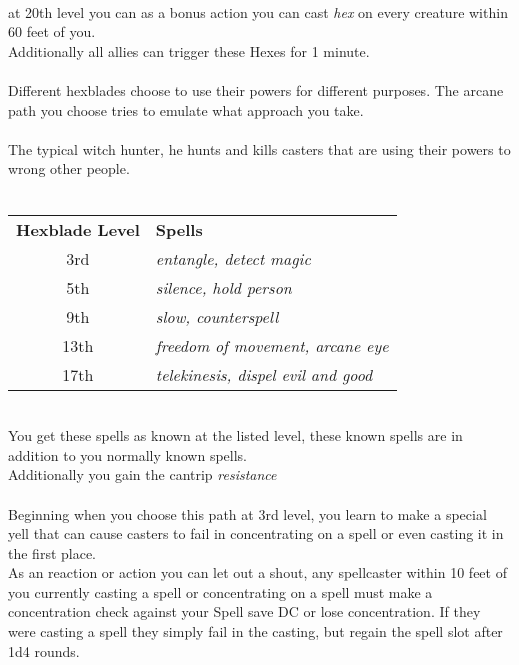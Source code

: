 \documentclass[a4paper]{article}
\begin{document}
\begin{multicols}{2}
\\
at 20th level you can as a bonus action you can cast \textit{hex} on every creature within 60 feet of you.\\
Additionally all allies can trigger these Hexes for 1 minute.\\
\\
Different hexblades choose to use their powers for different purposes. The arcane path you choose tries to emulate what approach you take.\\
\\
The typical witch hunter, he hunts and kills casters that are using their powers to wrong other people.\\
\\
\begin{tabular}{cp{5cm}}
{\bf Hexblade Level} & {\bf Spells}                         \\
\rowcolor[HTML]{B8EFAD} 
3rd                 & \textit{entangle, detect magic}\\
5th                 & \textit{silence, hold person}\\
\rowcolor[HTML]{B8EFAD} 
9th                 & \textit{slow, counterspell}\\
13th                & \textit{freedom of movement, arcane eye}\\
\rowcolor[HTML]{B8EFAD} 
17th                & \textit{telekinesis, dispel evil and good}\\
\end{tabular}
\\You get these spells as known at the listed level, these known spells are in addition to you normally known spells.\\
\indent Additionally you gain the cantrip \textit{resistance}\\
\\
Beginning when you choose this path at 3rd level, you learn to make a special yell that can cause casters to fail in concentrating on a spell or even casting it in the first place.\\
As an reaction or action you can let out a shout, any spellcaster within 10 feet of you currently casting a spell or concentrating on a spell must make a concentration check against your Spell save DC or lose concentration. If they were casting a spell they simply fail in the casting, but regain the spell slot after 1d4 rounds.\\

\end{multicols}
\end{document}
